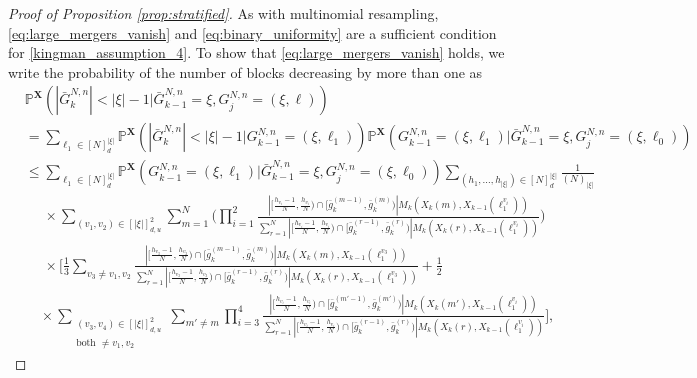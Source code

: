 \documentclass[a4paper,11pt]{article}
\theoremstyle{definition}
\newcommand{\bbP}{\mathbb{P}}
\newcommand{\bfX}{\mathbf{X}}
\begin{document}
\begin{proof}[Proof of Proposition \ref{prop:stratified}]
As with multinomial resampling, \eqref{eq:large_mergers_vanish} and \eqref{eq:binary_uniformity} are a sufficient condition for \eqref{kingman_assumption_4}.
To show that \eqref{eq:large_mergers_vanish} holds, we write the probability of the number of blocks decreasing by more than one as
\begin{align*}
&\bbP^{ \bfX }( | \bar{ G }_k^{ N, n } | < | \xi | - 1 | \bar{ G }_{ k - 1 }^{ N, n } = \xi, G_j^{ N, n } = ( \xi, \ell ) ) \\
&= \sum_{ \ell_1 \in [ N ]_d^{ | \xi | } } \bbP^{ \bfX }( | \bar{ G }_k^{ N, n } | < | \xi | - 1 | G_{ k - 1 }^{ N, n } = ( \xi, \ell_1 ) )  \bbP^{ \bfX }( G_{ k - 1 }^{ N, n } = ( \xi, \ell_1 ) | \bar{ G }_{ k - 1 }^{ N, n } = \xi, G_j^{ N, n } = ( \xi, \ell_0 ) ) \\
&\leq \sum_{ \ell_1 \in [ N ]_d^{ | \xi | } } \bbP^{ \bfX }( G_{ k - 1 }^{ N, n } = ( \xi, \ell_1 ) | \bar{ G }_{ k - 1 }^{ N, n } = \xi, G_j^{ N, n } = ( \xi, \ell_0 ) )  \sum_{ ( h_1, \ldots, h_{ | \xi | } ) \in [ N ]_d^{ | \xi | } }  \frac{ 1 }{ ( N )_{ | \xi | } } \\
&\phantom{\leq} \times \sum_{ ( v_1, v_2 ) \in [ | \xi | ]_{ d, u }^2 } \sum_{ m = 1 }^N \Bigg( \prod_{ i = 1 }^2 \frac{ | [ \frac{ h_{ v_i } - 1 }{ N }, \frac{ h_{ v_i } }{ N } ) \cap [ \bar{ g }_k^{ ( m - 1 ) }, \bar{ g }_k^{ ( m ) } ) | M_k( X_k( m ), X_{ k - 1 }( \ell_1^{ v_i } ) ) }{ \sum_{ r = 1 }^N | [ \frac{ h_{ v_i } - 1 }{ N }, \frac{ h_{ v_i } }{ N } ) \cap [ \bar{ g }_k^{ ( r - 1 ) }, \bar{ g }_k^{ ( r ) } ) | M_k( X_k( r ), X_{ k - 1 }( \ell_1^{ v_i } ) ) } \Bigg) \\
&\phantom{\leq} \times \Bigg[ \frac{ 1 }{ 3 } \sum_{ v_3 \neq v_1, v_2 } \frac{ | [ \frac{ h_{ v_3 } - 1 }{ N }, \frac{ h_{ v_3 } }{ N } ) \cap [ \bar{ g }_k^{ ( m - 1 ) }, \bar{ g }_k^{ ( m ) } ) | M_k( X_k( m ), X_{ k - 1 }( \ell_1^{ v_3 } ) ) }{ \sum_{ r = 1 }^N | [ \frac{ h_{ v_3 } - 1 }{ N }, \frac{ h_{ v_3 } }{ N } ) \cap [ \bar{ g }_k^{ ( r - 1 ) }, \bar{ g }_k^{ ( r ) } ) | M_k( X_k( r ), X_{ k - 1 }( \ell_1^{ v_3 } ) ) } + \frac{ 1 }{ 2 } \\
&\phantom{\times \Bigg[} \times \sum_{ \substack{ ( v_3, v_4 ) \in [ | \xi | ]_{ d, u }^2 \\ \text{both } \neq v_1, v_2 } } \sum_{ m' \neq m } \prod_{ i = 3 }^4 \frac{ | [ \frac{ h_{ v_i } - 1 }{ N }, \frac{ h_{ v_i } }{ N } ) \cap [ \bar{ g }_k^{ ( m' - 1 ) }, \bar{ g }_k^{ ( m' ) } ) | M_k( X_k( m' ), X_{ k - 1 }( \ell_1^{ v_i } ) ) }{ \sum_{ r = 1 }^N | [ \frac{ h_{ v_i } - 1 }{ N }, \frac{ h_{ v_i } }{ N } ) \cap [ \bar{ g }_k^{ ( r - 1 ) }, \bar{ g }_k^{ ( r ) } ) | M_k( X_k( r ), X_{ k - 1 }( \ell_1^{ v_i } ) ) } \Bigg],

\end{align*}
\end{proof}
\end{document}
